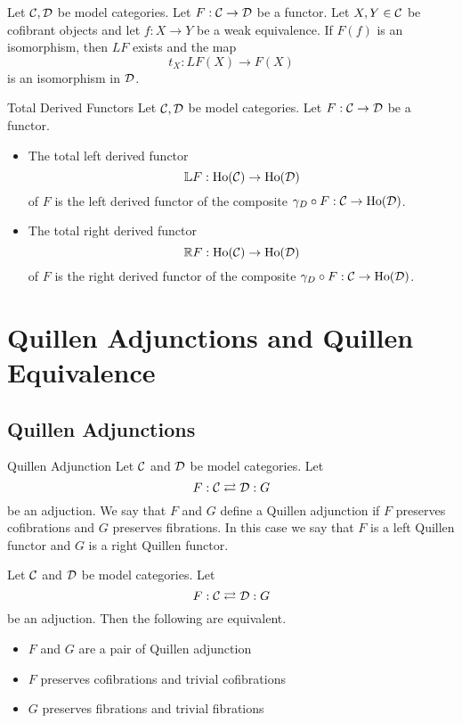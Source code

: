 \documentclass[a4paper]{article}
\begin{document}
\begin{prp}{}{} Let $\mathcal{C},\mathcal{D}$ be model categories. Let $F:\mathcal{C}\to\mathcal{D}$ be a functor. Let $X,Y\in\mathcal{C}$ be cofibrant objects and let $f:X\to Y$ be a weak equivalence. If $F(f)$ is an isomorphism, then $LF$ exists and the map $$t_X:LF(X)\to F(X)$$ is an isomorphism in $\mathcal{D}$. 
\end{prp}

\begin{defn}{Total Derived Functors}{} Let $\mathcal{C},\mathcal{D}$ be model categories. Let $F:\mathcal{C}\to\mathcal{D}$ be a functor. 
\begin{itemize}
\item The total left derived functor $$\mathbb{L} F:\text{Ho}(\mathcal{C})\to\text{Ho}(\mathcal{D})$$ of $F$ is the left derived functor of the composite $\gamma_D\circ F:\mathcal{C}\to\text{Ho}(\mathcal{D})$. 
\item The total right derived functor $$\mathbb{R} F:\text{Ho}(\mathcal{C})\to\text{Ho}(\mathcal{D})$$ of $F$ is the right derived functor of the composite $\gamma_D\circ F:\mathcal{C}\to\text{Ho}(\mathcal{D})$. 
\end{itemize}
\end{defn}


\pagebreak
\section{Quillen Adjunctions and Quillen Equivalence}
\subsection{Quillen Adjunctions}
\begin{defn}{Quillen Adjunction}{} Let $\mathcal{C}$ and $\mathcal{D}$ be model categories. Let $$F:\mathcal{C}\rightleftarrows\mathcal{D}:G$$ be an adjuction. We say that $F$ and $G$ define a Quillen adjunction if $F$ preserves cofibrations and $G$ preserves fibrations. In this case we say that $F$ is a left Quillen functor and $G$ is a right Quillen functor. 
\end{defn}

\begin{thm}{}{} Let $\mathcal{C}$ and $\mathcal{D}$ be model categories. Let $$F:\mathcal{C}\rightleftarrows\mathcal{D}:G$$ be an adjuction. Then the following are equivalent. 
\begin{itemize}
\item $F$ and $G$ are a pair of Quillen adjunction
\item $F$ preserves cofibrations and trivial cofibrations
\item $G$ preserves fibrations and trivial fibrations
\end{itemize}
\end{thm}
\end{document}
